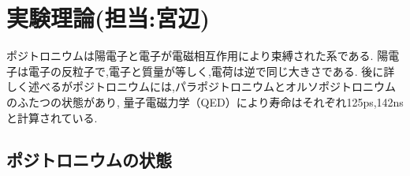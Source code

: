 \chapter{実験理論(担当:宮辺)}\label{theory}



ポジトロニウムは陽電子と電子が電磁相互作用により束縛された系である.
陽電子は電子の反粒子で,電子と質量が等しく,電荷は逆で同じ大きさである.
後に詳しく述べるがポジトロニウムには,パラポジトロニウムとオルソポジトロニウムのふたつの状態があり,
量子電磁力学（QED）により寿命はそれぞれ125ps,142ns と計算されている.


\section{ポジトロニウムの状態}

